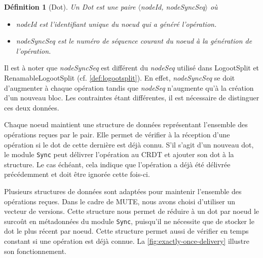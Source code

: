 \documentclass[12pt]{thesul}
\newtheorem{definition}{Définition}
\begin{document}
\begin{definition}[Dot]
  Un \emph{Dot} est une paire $\langle$nodeId, nodeSyncSeq$\rangle$ où
  \begin{itemize}
    \item nodeId est l'identifiant unique du noeud qui a généré l'opération.
    \item nodeSyncSeq est le numéro de séquence courant du noeud à la génération de l'opération.
  \end{itemize}
\end{definition}

Il est à noter que \emph{nodeSyncSeq} est différent du \emph{nodeSeq} utilisé dans LogootSplit et RenamableLogootSplit (cf. \autoref{def:logootsplit}).
En effet, \emph{nodeSyncSeq} se doit d'augmenter à chaque opération tandis que \emph{nodeSeq} n'augmente qu'à la création d'un nouveau bloc.
Les contraintes étant différentes, il est nécessaire de distinguer ces deux données.

Chaque noeud maintient une structure de données représentant l'ensemble des opérations reçues par le pair.
Elle permet de vérifier à la réception d'une opération si le dot de cette dernière est déjà connu.
S'il s'agit d'un nouveau dot, le module \texttt{Sync} peut délivrer l'opération au \ac{CRDT} et ajouter son dot à la structure.
Le cas échéant, cela indique que l'opération a déjà été délivrée précédemment et doit être ignorée cette fois-ci.

Plusieurs structures de données sont adaptées pour maintenir l'ensemble des opérations reçues.
Dans le cadre de MUTE, nous avons choisi d'utiliser un vecteur de versions.
Cette structure nous permet de réduire à un dot par noeud le surcoût en métadonnées du module \texttt{Sync}, puisqu'il ne nécessite que de stocker le dot le plus récent par noeud.
Cette structure permet aussi de vérifier en temps constant si une opération est déjà connue.
La \autoref{fig:exactly-once-delivery} illustre son fonctionnement.
\end{document}

